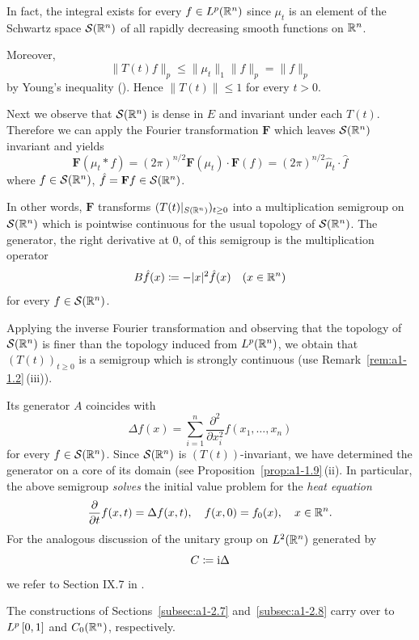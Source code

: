 In fact, the integral exists for every $f \in L^{p}(\mathbb{R}^{n})$ since $\mu_{t}$ is an element of the Schwartz space $\mathcal{S}(\mathbb{R}^{n})$ of all rapidly decreasing smooth functions on $\mathbb{R}^{n}$.

Moreover,
\[
    \|T(t)f\|_{p} \leq \|\mu_{t}\|_{1}\|f\|_{p} = \|f\|_{p}
\]
by Young's inequality (\textcite[p.28]{reedsimon:1975}). Hence $\|T(t)\| \leq 1$ for every $t > 0$.

Next we observe that $\mathcal{S}(\mathbb{R}^{n})$ is dense in $E$ and invariant under each $T(t)$.
Therefore we can apply the Fourier transformation $\mathbf{F}$ which leaves $\mathcal{S}(\mathbb{R}^{n})$ invariant and yields
\[
    \mathbf{F}(\mu_{t}*f) = (2\pi)^{n/2} \mathbf{F}(\mu_{t}) \cdot \mathbf{F}(f) 
    = (2\pi)^{n/2} \hat{\mu}_{t}\cdot\hat{f}
\]
where $f \in \mathcal{S}(\mathbb{R}^{n})$, $\hat{f} = \mathbf{F}f \in \mathcal{S}(\mathbb{R}^{n})$.

In other words, $\mathbf{F}$ transforms $(T(t)\vert_{ S(\R^{n})})_{t \geq 0}$ into a multiplication semigroup on $\mathcal{S}(\mathbb{R}^{n})$ which is pointwise continuous for the usual topology of\/ $\mathcal{S}(\mathbb{R}^{n})$.
The generator, \ie the right derivative at $0$, of this semigroup is the multiplication operator
\[
    B\hat{f}(x) \coloneq -|x|^{2}\hat{f}(x) \quad (x \in \mathbb{R}^{n})
\]
for every $f \in \mathcal{S}(\mathbb{R}^{n})$.

Applying the inverse Fourier transformation and observing that the topology of\/ $\mathcal{S}(\mathbb{R}^{n})$ is finer than the topology induced from $L^{p}(\mathbb{R}^{n})$, we obtain that $(T(t))_{t \geq 0}$ is a semigroup which is strongly continuous (use Remark~\ref{rem:a1-1.2}\,(iii)).

Its generator $A$ coincides with
\[
    \Delta f(x) = \sum_{i=1}^{n} \frac{\partial^{2}}{\partial x_{i}^{2}} f(x_{1},\ldots,x_{n})
\]
for every $f \in \mathcal{S}(\mathbb{R}^{n})$.
Since $\mathcal{S}(\mathbb{R}^{n})$ is $(T(t))$-invariant, we have determined the generator on a core of its domain (see Proposition~\ref{prop:a1-1.9}\,(ii).
In particular, the above semigroup \emph{solves} the initial value problem for the \emph{heat equation}
\[
    \frac{\partial}{\partial t} f(x,t) = \Delta f(x,t), \quad f(x,0) = f_{0}(x), \quad x \in \mathbb{R}^{n}.
\]
For the analogous discussion of the unitary group on $L^{2}(\mathbb{R}^{n})$ generated by
\[
    C \coloneq \mathrm{i}\Delta
\]
we refer to Section IX.7 in \textcite{reedsimon:1975}. 

The constructions of Sections~\ref{subsec:a1-2.7} 
and~\ref{subsec:a1-2.8} carry over to $L^{p}\left[ 0,1 \right]$ 
and $C_{0}(\mathbb{R}^{n})$, respectively.
